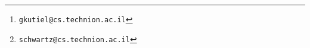 \title{\titletext}

\date{}

\author[1]{Gilad Kutiel	\thanks{\texttt{gkutiel@cs.technion.ac.il}}}
\author[1]{Roy Schwartz	\thanks{\texttt{schwartz@cs.technion.ac.il}}}

